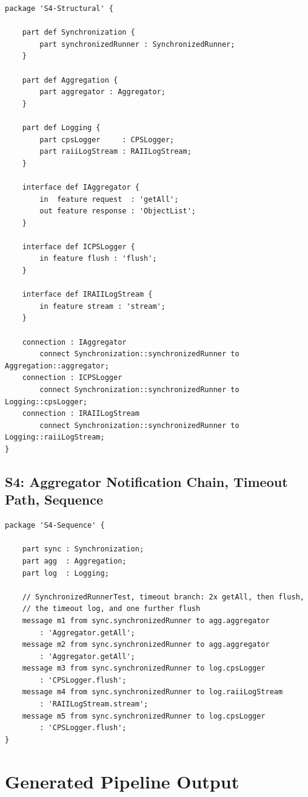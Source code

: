 \begin{verbatim}
package 'S4-Structural' {

    part def Synchronization {
        part synchronizedRunner : SynchronizedRunner;
    }

    part def Aggregation {
        part aggregator : Aggregator;
    }

    part def Logging {
        part cpsLogger     : CPSLogger;
        part raiiLogStream : RAIILogStream;
    }

    interface def IAggregator {
        in  feature request  : 'getAll';
        out feature response : 'ObjectList';
    }

    interface def ICPSLogger {
        in feature flush : 'flush';
    }

    interface def IRAIILogStream {
        in feature stream : 'stream';
    }

    connection : IAggregator
        connect Synchronization::synchronizedRunner to Aggregation::aggregator;
    connection : ICPSLogger
        connect Synchronization::synchronizedRunner to Logging::cpsLogger;
    connection : IRAIILogStream
        connect Synchronization::synchronizedRunner to Logging::raiiLogStream;
}
\end{verbatim}

\subsection{S4: Aggregator Notification Chain, Timeout Path, Sequence}

\begin{verbatim}
package 'S4-Sequence' {

    part sync : Synchronization;
    part agg  : Aggregation;
    part log  : Logging;

    // SynchronizedRunnerTest, timeout branch: 2x getAll, then flush,
    // the timeout log, and one further flush
    message m1 from sync.synchronizedRunner to agg.aggregator
        : 'Aggregator.getAll';
    message m2 from sync.synchronizedRunner to agg.aggregator
        : 'Aggregator.getAll';
    message m3 from sync.synchronizedRunner to log.cpsLogger
        : 'CPSLogger.flush';
    message m4 from sync.synchronizedRunner to log.raiiLogStream
        : 'RAIILogStream.stream';
    message m5 from sync.synchronizedRunner to log.cpsLogger
        : 'CPSLogger.flush';
}
\end{verbatim}


\section{Generated Pipeline Output}
\label{sec:appendix-generated}

